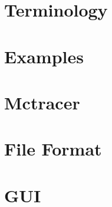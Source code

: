 \documentclass{article}
\begin{document}
\maketitle
\tableofcontents
\newpage

\section{Terminology} 
\section{Examples} 
\section{Mctracer} 
\section{File Format} 
\section{GUI} 
\end{document}
